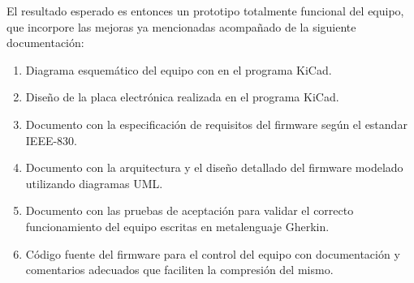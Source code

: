 El resultado esperado es entonces un prototipo totalmente funcional del equipo, que incorpore las mejoras ya mencionadas acompañado de la siguiente documentación:

\begin{enumerate}
	\item Diagrama esquemático del equipo con en el programa KiCad.
	\item Diseño de la placa electrónica realizada en el programa KiCad.
	\item Documento con la especificación de requisitos del firmware según el estandar IEEE-830.
	\item Documento con la arquitectura y el diseño detallado del firmware modelado utilizando diagramas UML.
	\item Documento con las pruebas de aceptación para validar el correcto funcionamiento del equipo escritas en metalenguaje Gherkin. 
	\item Código fuente del firmware para el control del equipo con documentación y comentarios adecuados que faciliten la compresión del mismo.
\end{enumerate}